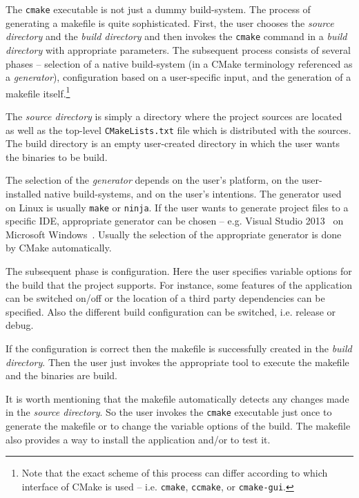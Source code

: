 \documentclass[12pt,oneside]{fithesis2}
\begin{document}
The \texttt{cmake} executable is not just a dummy build-system. The process of generating a makefile is quite sophisticated. First, the user chooses the \emph{source directory} and the \emph{build directory} and then invokes the \texttt{cmake} command in a \emph{build directory} with appropriate parameters. The subsequent process consists of several phases -- selection of a native build-system (in a CMake terminology referenced as a \emph{generator}), configuration based on a user-specific input, and the generation of a makefile itself.\footnote{Note that the exact scheme of this process can differ according to which interface of CMake is used -- i.e. \texttt{cmake}, \texttt{ccmake}, or \texttt{cmake-gui}.}~\cite{cmake_docs}

The \emph{source directory} is simply a directory where the project sources are located as well as the top-level \texttt{CMakeLists.txt} file which is distributed with the sources. The build directory is an empty user-created directory in which the user wants the binaries to be build.

The selection of the \emph{generator} depends on the user's platform, on the user-installed native build-systems, and on the user's intentions. The generator used on Linux is usually \texttt{make} or \texttt{ninja}. If the user wants to generate project files to a specific IDE, appropriate generator can be chosen -- e.g. Visual Studio 2013~\cite{msvc} on Microsoft Windows~\cite{win}. Usually the selection of the appropriate generator is done by CMake automatically.

The subsequent phase is configuration. Here the user specifies variable options for the build that the project supports. For instance, some features of the application can be switched on/off or the location of a third party dependencies can be specified. Also the different build configuration can be switched, i.e. release or debug.

If the configuration is correct then the makefile is successfully created in the \emph{build directory}. Then the user just invokes the appropriate tool to execute the makefile and the binaries are build.

It is worth mentioning that the makefile automatically detects any changes made in the \emph{source directory}. So the user invokes the \texttt{cmake} executable just once to generate the makefile or to change the variable options of the build. The makefile also provides a way to install the application and/or to test it.
\end{document}
